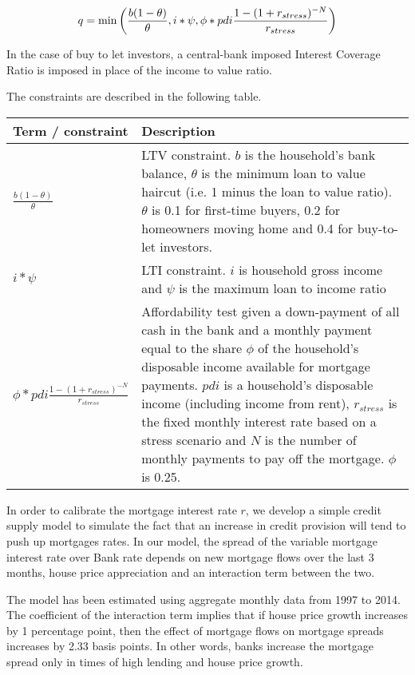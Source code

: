\documentclass{article}
\begin{document}
\bigskip 
\begin{equation}
q=\min \left( \frac{b(1-\theta )}{\theta },i\ast \psi ,\phi \ast pdi\frac{%
1-(1+r_{stress})^{-N}}{r_{stress}}\right)
\end{equation}

\bigskip

In the case of buy to let investors, a central-bank imposed Interest Coverage Ratio is imposed in place of the income to value ratio.

\bigskip The constraints are described in the following table.

\bigskip

\noindent \bigskip 
\begin{tabular}{p{1.5in}|p{4in}}
Term / constraint & Description \\ \hline\hline
$\frac{b(1-\theta )}{\theta }$ & LTV constraint. $b$ is the household's bank
balance, $\theta $ is the minimum loan to value haircut (i.e. 1 minus the
loan to value ratio). $\theta $ is 0.1 for first-time buyers, 0.2 for
homeowners moving home and 0.4 for buy-to-let investors. \\ 
$i\ast \psi $ & LTI constraint. $i$ is household gross income and $\psi $ is
the maximum loan to income ratio \\ 
$\phi \ast pdi\frac{1-(1+r_{stress})^{-N}}{r_{stress}}$ & Affordability test
given a down-payment of all cash in the bank and a monthly payment equal to
the share $\phi $ of the household's disposable income available for
mortgage payments. $pdi$ is a household's disposable income (including
income from rent), $r_{stress}$ is the fixed monthly interest rate based on
a stress scenario and $N$ is the number of monthly payments to pay off the
mortgage. $\phi $ is 0.25.%
\end{tabular}

\bigskip \bigskip

In order to calibrate the mortgage interest rate $r$, we develop a simple
credit supply model to simulate the fact that an increase in credit
provision will tend to push up mortgages rates. In our model, the spread of
the variable mortgage interest rate over Bank rate depends on new mortgage
flows over the last 3 months, house price appreciation and an interaction
term between the two.

The model has been estimated using aggregate monthly data from 1997 to 2014.
The coefficient of the interaction term implies that if house price growth
increases by 1 percentage point, then the effect of mortgage flows on
mortgage spreads increases by 2.33 basis points. In other words, banks
increase the mortgage spread only in times of high lending and house price
growth.
\end{document}
